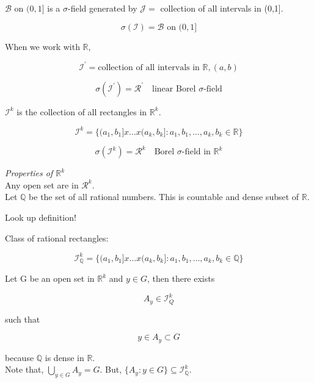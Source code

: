 \documentclass[11pt,fleqn]{book} %
\begin{document}
$\mathscr{B} \text{ on } (0,1]$ is a $\sigma$-field generated by $\mathscr{J} = $ collection of all intervals in (0,1].

	$$\sigma(\mathscr{I}) = \mathscr{B} \text{ on } (0,1]$$

When we work with $\mathbb{R}$, 

$$\mathscr{I}^\prime = \text{collection of all intervals in } \mathbb{R}, (a,b) $$

$$\sigma(\mathscr{I}^\prime) = \mathscr{R}^\prime \quad \text{linear Borel }\sigma\text{-field} $$


$\mathscr{I}^k $ is the collection of all rectangles in $\mathbb{R}^k$.

$$ \mathscr{I}^k = \{(a_1, b_1]x \dots x(a_k, b_k]: a_1, b_1, \dots, a_k, b_k \in \mathbb{R} \}$$

$$\sigma(\mathscr{I}^k) = \mathscr{R}^k \quad \text{Borel } \sigma\text{-field in } \mathbb{R}^k$$

\textit{Properties of $\mathbb{R}^k$}\\

Any open set are in $\mathscr{R}^k$.\\

Let $\mathbb{Q}$ be the set of all rational numbers. This is countable and dense subset of $\mathbb{R}$. \\

\begin{definition}[Dense]
	Look up definition!
\end{definition}

Class of rational rectangles: 

$$ \mathscr{I}^k_\mathbb{Q} = \{(a_1, b_1]x \dots x(a_k, b_k]: a_1, b_1, \dots, a_k, b_k \in \mathbb{Q} \}$$

Let G be an open set in $\mathbb{R}^k$ and $y \in G$, then there exists
 
$$ A_y \in  \mathscr{I}^k_Q $$

such that

$$y \in A_y \subset G $$

because $\mathbb{Q}$ is dense in $\mathbb{R}$.\\

Note that, $\bigcup_{y\in G} A_y = G$. But, $\{A_y: y \in G \} \subseteq \mathscr{I}^k_\mathbb{Q}$.\\








\end{document}
